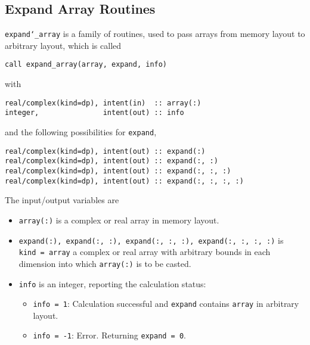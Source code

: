 \documentclass[12pt,a4paper]{article}
\begin{document}
\subsection{Expand Array Routines}
{\tt expand\char`_array} is a family of routines, used to pass arrays from memory layout to arbitrary layout, which is called
\begin{verbatim}
call expand_array(array, expand, info)
\end{verbatim}
with 
\begin{verbatim}
real/complex(kind=dp), intent(in)  :: array(:)
integer,               intent(out) :: info
\end{verbatim}
and the following possibilities for {\tt expand},
\begin{verbatim}
real/complex(kind=dp), intent(out) :: expand(:)
real/complex(kind=dp), intent(out) :: expand(:, :)
real/complex(kind=dp), intent(out) :: expand(:, :, :)
real/complex(kind=dp), intent(out) :: expand(:, :, :, :)
\end{verbatim}

The input/output variables are
\begin{itemize}
\item {\tt array(:)} is a complex or real array in memory layout.
\item {\tt expand(:), expand(:, :), expand(:, :, :), expand(:, :, :, :)} is \\ {\tt kind = array} a complex or real array with arbitrary bounds in each dimension into which {\tt array(:)} is to be casted.
\item {\tt info} is an integer, reporting the calculation status:
\begin{itemize}
\item {\tt info = 1}: Calculation successful and {\tt expand} contains {\tt array} in arbitrary layout.
\item {\tt info = -1}: Error. Returning {\tt expand = 0}.
\end{itemize}
\end{itemize}
\end{document}
